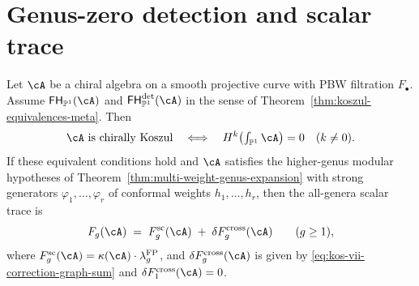 \section{Genus-zero detection and scalar trace}
\label{sec:kos-vii-theorem}

\begin{theorem}
\label{thm:koszulness-vii-multiweight-up-to-correction}
Let $\cA$ be a chiral algebra on a smooth projective curve with PBW
filtration $F_\bullet$. Assume
$\mathsf{FH}_{\mathbb{P}^1}(\cA)$ and
$\mathsf{FH}^{\mathrm{det}}_{\mathbb{P}^1}(\cA)$ in the sense of
Theorem~\textup{\ref{thm:koszul-equivalences-meta}}. Then
\[
\cA\ \textup{is chirally Koszul}
\quad\Longleftrightarrow\quad
H^k\!\left(\textstyle\int_{\mathbb{P}^1}\cA\right)=0
\quad(k\neq 0).
\]
If these equivalent conditions hold and $\cA$ satisfies the
higher-genus modular hypotheses of
Theorem~\textup{\ref{thm:multi-weight-genus-expansion}} with strong
generators $\varphi_1,\ldots,\varphi_r$ of conformal weights
$h_1,\ldots,h_r$, then the all-genera scalar trace is
\begin{equation}\label{eq:kos-vii-scalar-all-genera}
F_g(\cA)
\;=\;
F_g^{\mathrm{sc}}(\cA)
\;+\;
\delta F_g^{\mathrm{cross}}(\cA)
\qquad (g\geq 1),
\end{equation}
where
$F_g^{\mathrm{sc}}(\cA)=\kappa(\cA)\cdot\lambda_g^{\mathrm{FP}}$,
and $\delta F_g^{\mathrm{cross}}(\cA)$ is given by
\textup{\ref{eq:kos-vii-correction-graph-sum}} and
$\delta F_1^{\mathrm{cross}}(\cA)=0$.
\end{theorem}

